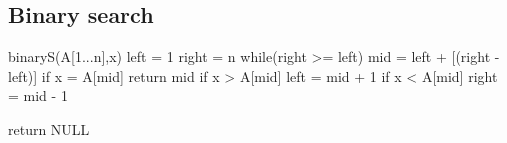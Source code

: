 \documentclass{article}
\begin{document}
    \subsection*{Binary search}\label{bs}
      \begin{code}
        binaryS(A[1...n],x)
          left = 1
          right = n
            while(right >= left)
              mid = left + [(right - left)\2]
              if x = A[mid]
                return mid
              if x > A[mid]
                left = mid + 1
              if x < A[mid]
                right = mid - 1
              
            return NULL
      \end{code}
\end{document}
